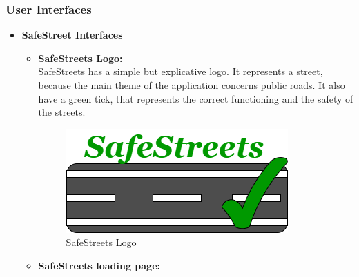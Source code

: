 \documentclass[titlepage]{article}
\begin{document}
\subsubsection{User Interfaces}
\begin{itemize}
	\item\textbf{SafeStreet Interfaces}
	\begin{itemize}
		\item \textbf{SafeStreets Logo:}\\
		SafeStreets has a simple but explicative logo. It represents a street, because the main theme of the application concerns public roads. It also have a green tick, that represents the correct functioning and the safety of the streets.\\ 
		
	\begin{figure}[h]
	\includegraphics[scale=0.8]{Mockups/LogoSafeStreets.png}
	\centering
	\caption{SafeStreets Logo}
\end{figure}
\FloatBarrier


	\newpage

	\item \textbf{SafeStreets loading page:}\\
	

\end{itemize}
\end{itemize}
\end{document}
